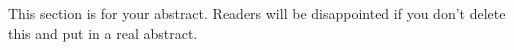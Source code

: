 %
%
%
%
%
%
This section is for your abstract. Readers will be disappointed if you don't delete this and put in a real abstract.

